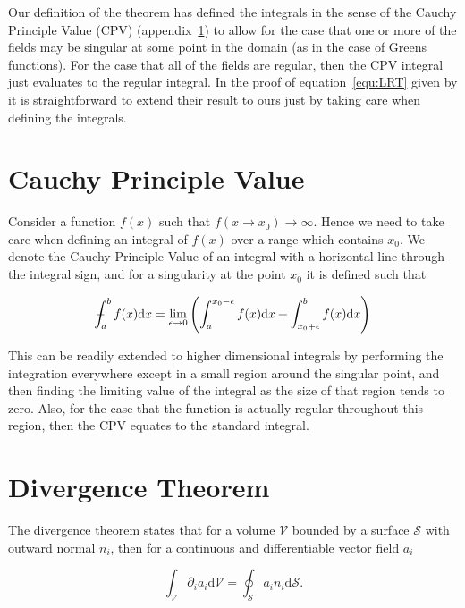 \documentclass[12pt]{article}
\def\Xint#1{\mathchoice
{\XXint\displaystyle\textstyle{#1}}%
{\XXint\textstyle\scriptstyle{#1}}%
{\XXint\scriptstyle\scriptscriptstyle{#1}}%
{\XXint\scriptscriptstyle\scriptscriptstyle{#1}}%
\!\int}
\def\XXint#1#2#3{{\setbox0=\hbox{$#1{#2#3}{\int}$}
\vcenter{\hbox{$#2#3$}}\kern-.5\wd0}}
\def\dashint{\Xint-}
\begin{document}
Our definition of the theorem has defined the integrals in the sense of the Cauchy Principle Value (CPV) (appendix~\ref{app:CPV}) to allow for the case that one or more of the fields may be singular at some point in the domain (as in the case of Greens functions). For the case that all of the fields are regular, then the CPV integral just evaluates to the regular integral. In the proof of equation~\ref{equ:LRT} given by \citet{Kim05} it is straightforward to extend their result to ours just by taking care when defining the integrals. 


\section{Cauchy Principle Value}
\label{app:CPV}

Consider a function $f(x)$ such that $f(x \to x_{0}) \to \infty$. Hence we need to take care when defining an integral of $f(x)$ over a range which contains $x_{0}$. We denote the Cauchy Principle Value of an integral with a horizontal line through the integral sign, and for a singularity at the point $x_{0}$ it is defined such that \citep{Boas83}

\begin{equation}
\label{equ:CPV}
\dashint_{a}^{b} f(x) \mathrm{d}x = \lim_{\epsilon \to 0} \left( \int_{a}^{x_{0} - \epsilon} f(x) \mathrm{d}x + \int_{x_{0} + \epsilon}^{b} f(x) \mathrm{d}x \right)
\end{equation}

This can be readily extended to higher dimensional integrals by performing the integration everywhere except in a small region around the singular point, and then finding the limiting value of the integral as the size of that region tends to zero. Also, for the case that the function is actually regular throughout this region, then the CPV equates to the standard integral.


\section{Divergence Theorem}
\label{app:div_theory}

The divergence theorem states that for a volume $\mathcal{V}$ bounded by a surface $\mathcal{S}$ with outward normal $n_{i}$, then for a continuous and differentiable vector field $a_{i}$ \citep{Riley06}

\begin{equation}
\label{equ:div_theory}
\int_{\mathcal{V}} \partial_{i} a_{i} \mathrm{d} \mathcal{V} = \oint_{\mathcal{S}} a_{i} n_{i} \mathrm{d} \mathcal{S}.
\end{equation}
\end{document}
